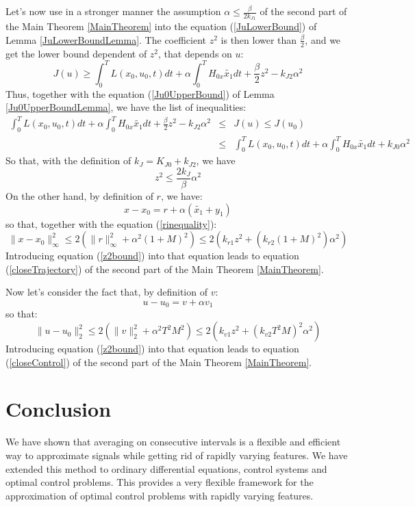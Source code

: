 \documentclass[a4paper,10pt]{article}
\begin{document}
Let's now use in a stronger manner the assumption $\alpha \leq \frac{\beta}{2k_{J1}}$ of 
the second part of the Main Theorem \ref{MainTheorem} into the 
equation (\ref{JuLowerBound}) of Lemma \ref{JuLowerBoundLemma}. The 
coefficient $z^{2}$ is then lower than $\frac{\beta}{2}$, and we get the lower bound 
dependent of $z^{2}$, that depends on $u$:
\[
           J(u) \geq \int_{0}^{T} L(x_{0},u_{0},t) dt
	+ \alpha \int_{0}^{T} H_{0x} \tilde{x_{1}} dt
	+\frac{\beta}{2}z^{2}
	- k_{J2}\alpha^{2}
\]
Thus, together with the 
equation (\ref{Ju0UpperBound}) of Lemma \ref{Ju0UpperBoundLemma}, we have the list of inequalities:
\begin{eqnarray*}
   \int_{0}^{T} L(x_{0},u_{0},t) dt
	+ \alpha \int_{0}^{T} H_{0x} \tilde{x_{1}} dt
	+\frac{\beta}{2}z^{2}
	- k_{J2}\alpha^{2}
  & \leq & J(u) \leq J(u_{0}) \\
  & \leq & \int_{0}^{T} L(x_{0},u_{0},t) dt
	+ \alpha \int_{0}^{T} H_{0x} \tilde{x_{1}} dt
	+ k_{J0}\alpha^{2}
\end{eqnarray*}
So that, with the definition of $k_{J}=K_{J0}+k_{J2}$, we have
\begin{equation}
    z^{2} \leq \frac{2k_{J}}{\beta}\alpha^{2}
    \label{z2bound}
\end{equation}
On the other hand, by definition of $r$, we have:
\[
    x-x_{0} = r + \alpha(\tilde{x_{1}}+y_{1})
\]
so that, together with the equation (\ref{rinequality}):
\[
    \|x-x_{0}\|_{\infty}^{2} \leq 2 \left( \|r\|_{\infty}^{2} + 
    \alpha^{2}(1+M)^{2} \right) 
    \leq 2 \left(k_{r1}z^{2} + 
    (k_{r2}(1+M)^{2}) \alpha^{2} \right)
\]
Introducing equation (\ref{z2bound}) into that equation leads to 
equation (\ref{closeTrajectory}) of the second part
of the Main Theorem \ref{MainTheorem}.

Now let's consider the fact that, by definition of $v$:
\[
    u-u_{0} = v + \alpha v_{1}
\]
so that:
\[
    \|u-u_{0}\|_{2}^{2} \leq 2 \left( \|v\|_{2}^{2} + 
    \alpha^{2}T^{2}M^{2} \right) 
    \leq 2 \left(k_{v1}z^{2} + 
    (k_{v2}T^{2}M)^{2} \alpha^{2} \right)
\]
Introducing equation (\ref{z2bound}) into that equation leads to 
equation (\ref{closeControl}) of the second part 
of the Main Theorem \ref{MainTheorem}.

\section{Conclusion}\label{conclusionsec}
We have shown that averaging on consecutive intervals is a flexible 
and efficient 
way to approximate signals while getting rid of rapidly varying 
features. We have extended this method to ordinary 
differential equations, control systems and optimal control problems. 
This provides a very flexible framework for the approximation of 
optimal control problems with rapidly varying features.
\end{document}
